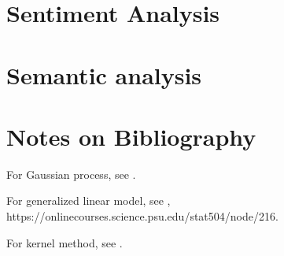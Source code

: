 \begin{refsection}
\section{Sentiment Analysis}




\section{Semantic analysis}	









\section{Notes on Bibliography}
For Gaussian process, see \cite{rasmussen2006gaussian}.


For generalized linear model, see \cite{dobson2008introduction}, https://onlinecourses.science.psu.edu/stat504/node/216.


For kernel method, see \cite{shawe2004kernel}.

\printbibliography
\end{refsection}

